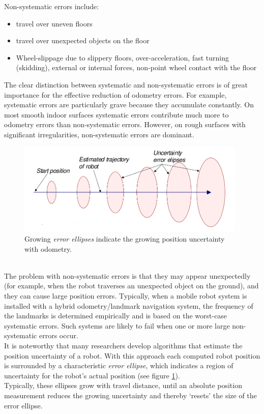 Non-systematic errors include:

\begin{itemize}
\item travel over uneven floors
\item travel over unexpected objects on the floor
\item Wheel-slippage due to slippery floors, over-acceleration,
  fast turning (skidding), external or internal forces, non-point wheel
  contact with the floor
\end{itemize}

The clear distinction between systematic and non-systematic errors is
of great importance for the effective reduction of odometry errors. For example,
systematic errors are particularly grave because they accumulate constantly.
On most smooth indoor surfaces systematic errors contribute much
more to odometry errors than non-systematic errors.
However, on rough surfaces with significant irregularities, non-systematic
errors are dominant.
\begin{figure} [h]
  \begin{center}
    \includegraphics[width=310pt]{img/odometry_error.png}
    \caption{Growing \textit{error ellipses} indicate the growing position
      uncertainty with odometry.}
    \label{fig:odometry_error}
  \end{center}
\end{figure}
\\
The problem with non-systematic errors is that they may appear unexpectedly
(for example, when the robot traverses an unexpected object on the
ground), and they can cause large position errors. Typically, when a mobile
robot system is installed with a hybrid odometry/landmark navigation system,
the frequency of the landmarks is determined
empirically and is based on the worst-case systematic errors. Such systems
are likely to fail when one or more large non-systematic errors occur.
\\
It is noteworthy that many researchers develop algorithms that estimate
the position uncertainty of a robot. With this approach each computed robot
position is surrounded by a characteristic \textit{error ellipse}, which
indicates a region of uncertainty for the robot's actual position (see
figure \ref{fig:odometry_error}).
\\
Typically, these ellipses grow with travel distance, until an absolute
position measurement reduces the growing uncertainty and thereby `resets'
the size of the error ellipse.

